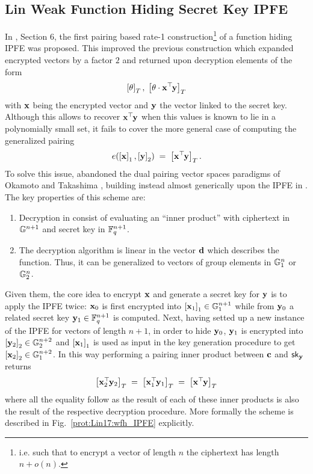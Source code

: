 
\newcommand{\IPsetup}{\cd{IP.Setup}}
\newcommand{\IPenc}{\cd{IP.Enc}}
\newcommand{\IPkeygen}{\cd{IP.KeyGen}}
\newcommand{\IPdec}{\cd{IP.Dec}}



\subsection{Lin Weak Function Hiding Secret Key IPFE}
In \cite{C:Lin17}, Section 6, the first pairing based rate-1 construction\footnote{i.e. such that to encrypt a vector of length $n$ the ciphertext has length $n + o(n)$.} of a function hiding IPFE was proposed.
This improved the previous construction \cite{AC:BisJaiKow15} which expanded encrypted vectors by a factor $2$ and returned upon decryption elements of the form
\[
	\gexp{T}{\theta}
		, \;
	\gexp{T}{\theta \cdot \vc{x}^\trs \vc{y}}
\]
with $\vc{x}$ being the encrypted vector and $\vc{y}$ the vector linked to the secret key.
Although this allows to recover $\vc{x}^\trs \vc{y}$ when this values is known to lie in a polynomially small set, it fails to cover the more general case of computing the generalized pairing
\[
	e(\gexp{1}{\vc{x}}, \gexp{2}{\vc{y}})
		\; = \;
	\gexp{T}{\vc{x}^\trs \vc{y}}.
\]
%
To solve this issue, \cite{C:Lin17} abandoned the dual pairing vector spaces paradigms of Okamoto and Takashima \cite{PAIRING:OkaTak08, AC:OkaTak09}, building instead almost generically upon the IPFE in \cite{PKC:ABDP15}.
The key properties of this scheme are:
\begin{enumerate}
	\item Decryption in \cite{PKC:ABDP15} consist of evaluating an ``inner product'' with ciphertext in $\G^{n+1}$ and secret key in $\F_q^{n+1}$.
	
	\item The decryption algorithm is linear in the vector $\vc{d}$ which describes the function.
	Thus, it can be generalized to vectors of group elements in $\G_1^n$ or $\G_2^n$.
\end{enumerate}
Given them, the core idea to encrypt $\vc{x}$ and generate a secret key for $\vc{y}$ is to apply the IPFE twice: 
$\vc{x}_0$ is first encrypted into $\gexp{1}{\vc{x}_1} \in \G_1^{n+1}$ while from $\vc{y}_0$ a related secret key $\vc{y}_1 \in \F_q^{n+1}$ is computed.
Next, having setted up a new instance of the IPFE for vectors of length $n+1$, in order to hide $\vc{y}_0$, $\vc{y}_1$ is encrypted into $\gexp{2}{\vc{y}_2} \in \G_2^{n+2}$ and $\gexp{1}{\vc{x}_1}$ is used as input in the key generation procedure to get $\gexp{2}{\vc{x}_2} \in \G_1^{n+2}$.
In this way performing a pairing inner product between $\vc{c}$ and $\sk_\vc{y}$ returns
\[
	\gexp{T}{\vc{x}_2^\trs \vc{y}_2}
		\; = \;
	\gexp{T}{\vc{x}_1^\trs \vc{y}_1}
		\; = \;
	\gexp{T}{\vc{x}^\trs \vc{y}}
\]
where all the equality follow as the result of each of these inner products is also the result of the respective decryption procedure.
More formally the scheme is described in Fig.~\ref{prot:Lin17:wfh_IPFE} explicitly.

